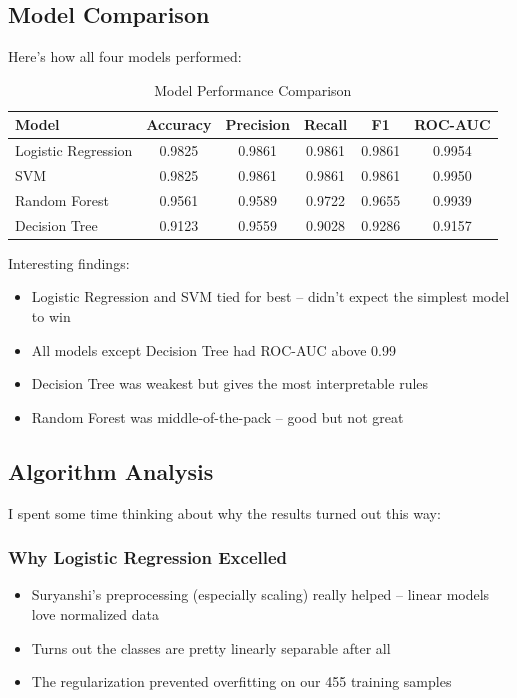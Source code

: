 \documentclass[12pt]{article}
\begin{document}
\subsection{Model Comparison}

Here's how all four models performed:

\begin{table}[H]
\centering
\caption{Model Performance Comparison}
\begin{tabular}{|l|c|c|c|c|c|}
\hline
\textbf{Model} & \textbf{Accuracy} & \textbf{Precision} & \textbf{Recall} & \textbf{F1} & \textbf{ROC-AUC} \\ \hline
Logistic Regression & 0.9825 & 0.9861 & 0.9861 & 0.9861 & 0.9954 \\ \hline
SVM & 0.9825 & 0.9861 & 0.9861 & 0.9861 & 0.9950 \\ \hline
Random Forest & 0.9561 & 0.9589 & 0.9722 & 0.9655 & 0.9939 \\ \hline
Decision Tree & 0.9123 & 0.9559 & 0.9028 & 0.9286 & 0.9157 \\ \hline
\end{tabular}
\end{table}

Interesting findings:
\begin{itemize}
    \item Logistic Regression and SVM tied for best -- didn't expect the simplest model to win
    \item All models except Decision Tree had ROC-AUC above 0.99
    \item Decision Tree was weakest but gives the most interpretable rules
    \item Random Forest was middle-of-the-pack -- good but not great
\end{itemize}

\subsection{Algorithm Analysis}

I spent some time thinking about why the results turned out this way:

\subsubsection{Why Logistic Regression Excelled}
\begin{itemize}
    \item Suryanshi's preprocessing (especially scaling) really helped -- linear models love normalized data
    \item Turns out the classes are pretty linearly separable after all
    \item The regularization prevented overfitting on our 455 training samples
\end{itemize}
\end{document}
